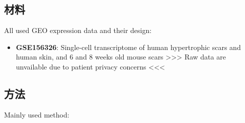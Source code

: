 \documentclass[
]{article}
\providecommand{\tightlist}{%
  \setlength{\itemsep}{0pt}\setlength{\parskip}{0pt}}
\begin{document}
\hypertarget{ux6750ux6599}{%
\subsection{材料}\label{ux6750ux6599}}

All used GEO expression data and their design:

\begin{itemize}
\tightlist
\item
  \textbf{GSE156326}: Single-cell transcriptome of human hypertrophic scars and human skin, and 6 and 8 weeks old mouse scars
  \textgreater\textgreater\textgreater{} Raw data are unvailable due to patient privacy concerns \textless\textless\textless{}
\end{itemize}

\hypertarget{ux65b9ux6cd5}{%
\subsection{方法}\label{ux65b9ux6cd5}}

Mainly used method:
\end{document}
